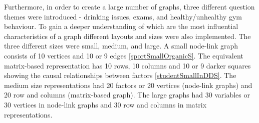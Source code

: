 \documentclass{l4proj}
\begin{document}
Furthermore, in order to create a large number of graphs, three different question themes were introduced - drinking issues, exams, and healthy/unhealthy gym behaviour. To gain a deeper understanding of which are the most influential characteristics of a graph different layouts and sizes were also implemented. The three different sizes were small, medium, and large. A small node-link graph consists of 10 vertices and 10 or 9 edges \ref{sportSmallOrganicS}. The equivalent matrix-based representation has 10 rows, 10 columns and 10 or 9 darker squares showing the causal relationships between factors \ref{studentSmallInDDS}. The medium size representations had 20 factors or 20 vertices (node-link graphs) and 20 row and columns (matrix-based graph). The large graphs had 30 variables or 30 vertices in node-link graphs and 30 row and columns in matrix representations. 
\end{document}
